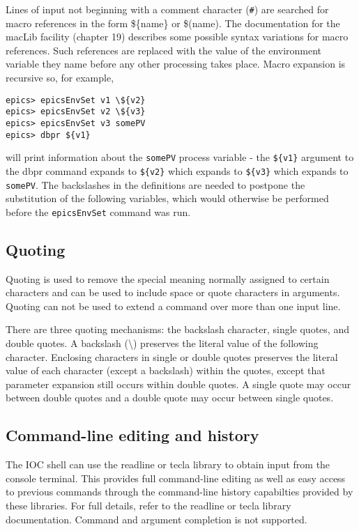 Lines of input not beginning with a comment character (\verb|#|) are searched for macro references in the form \$\{name\} or \$(name).
The documentation for the macLib facility (chapter 19) describes some possible syntax variations for macro references.
Such references are replaced with the value of the environment variable they name before any other processing takes place.
Macro expansion is recursive so, for example,

\begin{verbatim}
epics> epicsEnvSet v1 \${v2}
epics> epicsEnvSet v2 \${v3}
epics> epicsEnvSet v3 somePV
epics> dbpr ${v1}
\end{verbatim}

will print information about the \verb|somePV| process variable - the \verb|${v1}| argument to the dbpr command expands to \verb|${v2}| which expands to \verb|${v3}| which expands to \verb|somePV|.
The backslashes in the definitions are needed to postpone the substitution of the following variables, which would otherwise be performed before the \verb|epicsEnvSet| command was run.

\subsection{Quoting}

Quoting is used to remove the special meaning normally assigned to certain characters and can be used to include space or quote characters in arguments.
Quoting can not be used to extend a command over more than one input line.

There are three quoting mechanisms: the backslash character, single quotes, and double quotes.
A backslash (\textbackslash{}) preserves the literal value of the following character.
Enclosing characters in single or double quotes preserves the literal value of each character (except a backslash) within the quotes, except that parameter expansion still occurs within double quotes.
A single quote may occur between double quotes and a double quote may occur between single quotes.

\subsection{Command-line editing and history}

The IOC shell can use the readline or tecla library to obtain input from the console terminal. This provides full command-line editing as well as easy access to previous commands through the command-line history capabilties provided by these libraries.
For full details, refer to the readline or tecla library documentation.
Command and argument completion is not supported.

